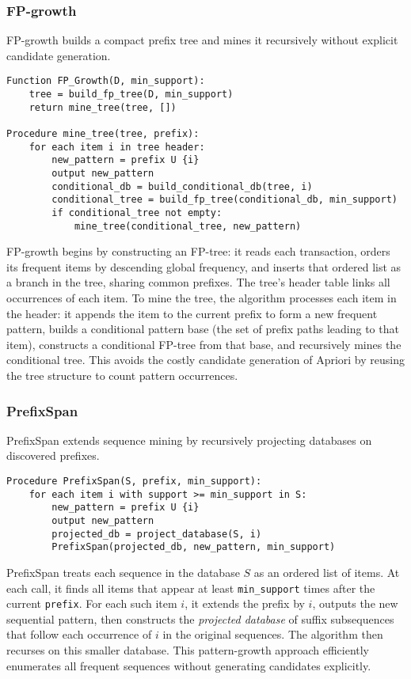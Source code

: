 \subsubsection{FP-growth}

FP-growth \cite{han2000mining} builds a compact prefix tree and mines it recursively without explicit candidate generation.

\begin{verbatim}
Function FP_Growth(D, min_support):
    tree = build_fp_tree(D, min_support)
    return mine_tree(tree, [])

Procedure mine_tree(tree, prefix):
    for each item i in tree header:
        new_pattern = prefix U {i}
        output new_pattern
        conditional_db = build_conditional_db(tree, i)
        conditional_tree = build_fp_tree(conditional_db, min_support)
        if conditional_tree not empty:
            mine_tree(conditional_tree, new_pattern)
\end{verbatim}

FP-growth begins by constructing an FP-tree: it reads each transaction, orders its frequent items by descending global frequency, and inserts that ordered list as a branch in the tree, sharing common prefixes.  The tree's header table links all occurrences of each item.  To mine the tree, the algorithm processes each item in the header: it appends the item to the current prefix to form a new frequent pattern, builds a conditional pattern base (the set of prefix paths leading to that item), constructs a conditional FP-tree from that base, and recursively mines the conditional tree.  This avoids the costly candidate generation of Apriori by reusing the tree structure to count pattern occurrences.

\subsubsection{PrefixSpan}

PrefixSpan \cite{pei2001prefixspan} extends sequence mining by recursively projecting databases on discovered prefixes.

\begin{verbatim}
Procedure PrefixSpan(S, prefix, min_support):
    for each item i with support >= min_support in S:
        new_pattern = prefix U {i}
        output new_pattern
        projected_db = project_database(S, i)
        PrefixSpan(projected_db, new_pattern, min_support)
\end{verbatim}

PrefixSpan treats each sequence in the database \(S\) as an ordered list of items.  At each call, it finds all items that appear at least \texttt{min\_support} times after the current \texttt{prefix}.  For each such item \(i\), it extends the prefix by \(i\), outputs the new sequential pattern, then constructs the \emph{projected database} of suffix subsequences that follow each occurrence of \(i\) in the original sequences.  The algorithm then recurses on this smaller database.  This pattern-growth approach efficiently enumerates all frequent sequences without generating candidates explicitly.

